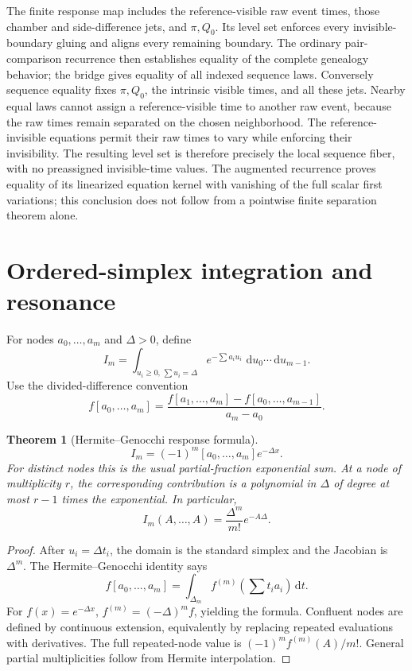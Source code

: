 \documentclass[11pt]{article}
\newtheorem{theorem}{Theorem}[section]
\newcommand{\dd}{\,\mathrm d}
\begin{document}
The finite response map includes the reference-visible raw event times, those chamber and side-difference jets, and $\pi,Q_0$.  Its level set enforces every invisible-boundary gluing and aligns every remaining boundary.  The ordinary pair-comparison recurrence then establishes equality of the complete genealogy behavior; the bridge gives equality of all indexed sequence laws.  Conversely sequence equality fixes $\pi,Q_0$, the intrinsic visible times, and all these jets.  Nearby equal laws cannot assign a reference-visible time to another raw event, because the raw times remain separated on the chosen neighborhood.  The reference-invisible equations permit their raw times to vary while enforcing their invisibility.  The resulting level set is therefore precisely the local sequence fiber, with no preassigned invisible-time values.  The augmented recurrence proves equality of its linearized equation kernel with vanishing of the full scalar first variations; this conclusion does not follow from a pointwise finite separation theorem alone.

\section{Ordered-simplex integration and resonance}

For nodes $a_0,\ldots,a_m$ and $\Delta>0$, define
\[
I_m=\int_{u_i\ge0,\,\sum u_i=\Delta}e^{-\sum a_iu_i}\,\dd u_0\cdots\dd u_{m-1}.
\]
Use the divided-difference convention
\[
f[a_0,\ldots,a_m]
=\frac{f[a_1,\ldots,a_m]-f[a_0,\ldots,a_{m-1}]}{a_m-a_0}.
\]

\begin{theorem}[Hermite--Genocchi response formula]
\[
I_m=(-1)^m[a_0,\ldots,a_m]e^{-\Delta x}.
\]
For distinct nodes this is the usual partial-fraction exponential sum.  At a node of multiplicity $r$, the corresponding contribution is a polynomial in $\Delta$ of degree at most $r-1$ times the exponential.  In particular,
\[
I_m(A,\ldots,A)=\frac{\Delta^m}{m!}e^{-A\Delta}.
\]
\end{theorem}

\begin{proof}
After $u_i=\Delta t_i$, the domain is the standard simplex and the Jacobian is $\Delta^m$.  The Hermite--Genocchi identity says
\[
f[a_0,\ldots,a_m]=\int_{\Delta_m}f^{(m)}\left(\sum t_ia_i\right)\dd t.
\]
For $f(x)=e^{-\Delta x}$, $f^{(m)}=(-\Delta)^mf$, yielding the formula.  Confluent nodes are defined by continuous extension, equivalently by replacing repeated evaluations with derivatives.  The full repeated-node value is $(-1)^mf^{(m)}(A)/m!$.  General partial multiplicities follow from Hermite interpolation.
\end{proof}
\end{document}
